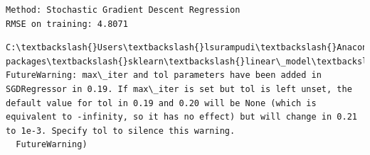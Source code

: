 \documentclass[11pt]{article}
\begin{document}
    \begin{Verbatim}[commandchars=\\\{\}]
Method: Stochastic Gradient Descent Regression
RMSE on training: 4.8071

    \end{Verbatim}

    \begin{Verbatim}[commandchars=\\\{\}]
C:\textbackslash{}Users\textbackslash{}lsurampudi\textbackslash{}Anaconda3\textbackslash{}envs\textbackslash{}py36\textbackslash{}lib\textbackslash{}site-packages\textbackslash{}sklearn\textbackslash{}linear\_model\textbackslash{}stochastic\_gradient.py:183: FutureWarning: max\_iter and tol parameters have been added in SGDRegressor in 0.19. If max\_iter is set but tol is left unset, the default value for tol in 0.19 and 0.20 will be None (which is equivalent to -infinity, so it has no effect) but will change in 0.21 to 1e-3. Specify tol to silence this warning.
  FutureWarning)

    \end{Verbatim}


    
    
    
    
\end{document}
